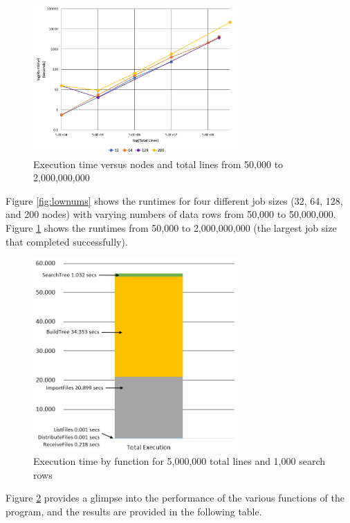 \begin{figure}
\centering
\includegraphics[width=0.7\textwidth]{./images/Runtime2.png}
\caption{Execution time versus nodes and total lines from 50,000 to 2,000,000,000}
\label{fig:allnums}
\end{figure}

Figure \ref{fig:lownums} shows the runtimes for four different job sizes (32, 64, 128, and 200 nodes) with varying numbers of data rows from 50,000 to 50,000,000. Figure \ref{fig:allnums} shows the runtimes from 50,000 to 2,000,000,000 (the largest job size that completed successfully).


\begin{figure}
\centering
\includegraphics[width=0.7\textwidth]{./images/Runtime3.png}
\caption{Execution time by function for 5,000,000 total lines and 1,000 search rows}
\label{fig:breakdown}
\end{figure}


Figure \ref{fig:breakdown} provides a glimpse into the performance of the various functions of the program, and the results are provided in the following table. \\

